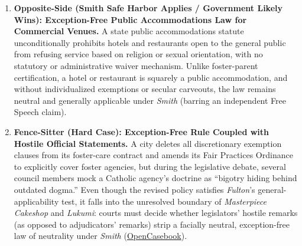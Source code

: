 \documentclass[12pt]{article}
\begin{document}
\begin{enumerate}
    \item \textbf{Opposite-Side (Smith Safe Harbor Applies / Government Likely Wins): Exception-Free Public Accommodations Law for Commercial Venues.} A state public accommodations statute unconditionally prohibits hotels and restaurants open to the general public from refusing service based on religion or sexual orientation, with no statutory or administrative waiver mechanism. Unlike foster-parent certification, a hotel or restaurant is squarely a public accommodation, and without individualized exemptions or secular carveouts, the law remains neutral and generally applicable under \textit{Smith} (barring an independent Free Speech claim).
    \item \textbf{Fence-Sitter (Hard Case): Exception-Free Rule Coupled with Hostile Official Statements.} A city deletes all discretionary exemption clauses from its foster-care contract and amends its Fair Practices Ordinance to explicitly cover foster agencies, but during the legislative debate, several council members mock a Catholic agency's doctrine as ``bigotry hiding behind outdated dogma.'' Even though the revised policy satisfies \textit{Fulton}'s general-applicability test, it falls into the unresolved boundary of \textit{Masterpiece Cakeshop} and \textit{Lukumi}: courts must decide whether legislators' hostile remarks (as opposed to adjudicators' remarks) strip a facially neutral, exception-free law of neutrality under \textit{Smith} (\href{https://opencasebook.org/casebooks/4501-constitutional-law/resources/12.9-fulton-v-city-of-philadelphia-2020/}{OpenCasebook}).
\end{enumerate}
\end{document}
